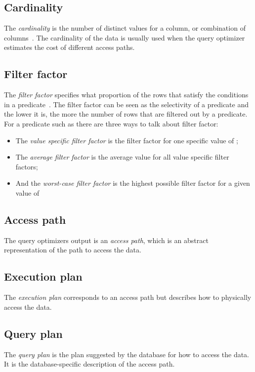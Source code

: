 \subsection*{Cardinality}
The \textit{cardinality} is the number of distinct values for a column, or
combination of columns~\cite{lahdenmaki_2005_relational_rdidatodossea}. The
cardinality of the data is usually used when the query optimizer estimates the
cost of different access paths.

\subsection*{Filter factor}
The \textit{filter factor} specifies what proportion of the rows that    satisfy
the conditions in a predicate~\cite{lahdenmaki_2005_relational_rdidatodossea}.
The filter factor can be seen as the selectivity of a predicate and the lower it
is, the more the number of rows that are filtered out by a predicate. For a
predicate such as  there are three ways to talk about
filter factor:
\begin{itemize}
\item The \textit{value specific filter factor} is the filter factor for one
  specific value of ;
\item The \textit{average filter factor} is the average value for all value
  specific filter factors;
\item And the \textit{worst-case filter factor} is the highest possible filter
  factor for a given value of 
\end{itemize}

\subsection*{Access path}
The query optimizers output is an \textit{access path}, which is an abstract
representation of the path to access the data.

\subsection*{Execution plan}
The \textit{execution plan} corresponds to an access path but describes how to
physically access the data.

\subsection*{Query plan}
The \textit{query plan} is the plan suggested by the database for how to access
the data. It is the database-specific description of the access path.
